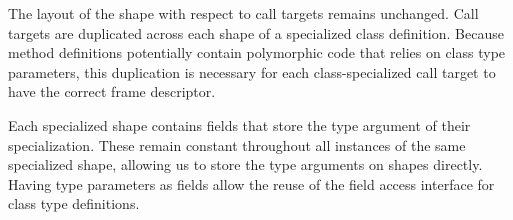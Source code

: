 The layout of the shape with respect to call targets remains unchanged.
Call targets are duplicated across each shape of a specialized class definition.
Because method definitions potentially contain polymorphic code that relies on class type parameters, this duplication is necessary for each class-specialized call target to have the correct frame descriptor.

Each specialized shape contains fields that store the type argument of their specialization.
These remain constant throughout all instances of the same specialized shape, allowing us to store the type arguments on shapes directly.
Having type parameters as fields allow the reuse of the field access interface for class type definitions.
